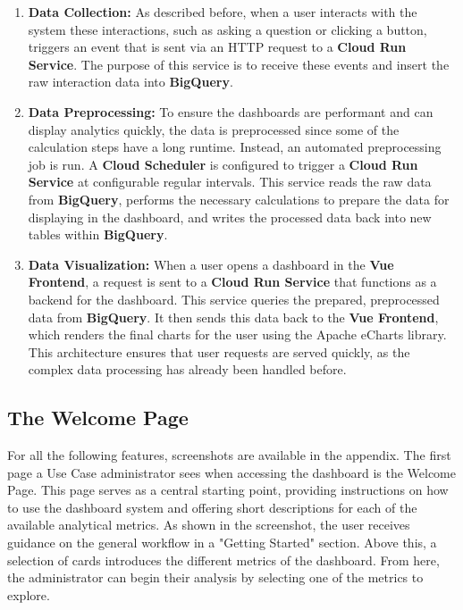 \documentclass[
	english,
	ruledheaders=section,%
	class=report,%
	thesis={type=bachelor},%
	accentcolor=1b,%
	custommargins=true,%
	marginpar=false,%
	parskip=half-,%
	fontsize=11pt,%
	DIV=14,
]{tudapub}
\begin{document}
\begin{enumerate}
    \item \textbf{Data Collection:} As described before, when a user interacts with the system these interactions, such as asking a question or clicking a button, triggers an event that is sent via an HTTP request to a \textbf{Cloud Run Service}. The purpose of this service is to receive these events and insert the raw interaction data into \textbf{BigQuery}.

    \item \textbf{Data Preprocessing:} To ensure the dashboards are performant and can display analytics quickly, the data is preprocessed since some of the calculation steps have a long runtime. Instead, an automated preprocessing job is run. A \textbf{Cloud Scheduler} is configured to trigger a \textbf{Cloud Run Service} at configurable regular intervals. This service reads the raw data from \textbf{BigQuery}, performs the necessary calculations to prepare the data for displaying in the dashboard, and writes the processed data back into new tables within \textbf{BigQuery}.

    \item \textbf{Data Visualization:} When a user opens a dashboard in the \textbf{Vue Frontend}, a request is sent to a \textbf{Cloud Run Service} that functions as a backend for the dashboard. This service queries the prepared, preprocessed data from \textbf{BigQuery}. It then sends this data back to the \textbf{Vue Frontend}, which renders the final charts for the user using the Apache eCharts library. This architecture ensures that user requests are served quickly, as the complex data processing has already been handled before.
\end{enumerate}
\subsection{The Welcome Page}
For all the following features, screenshots are available in the appendix.
The first page a Use Case administrator sees when accessing the dashboard is the Welcome Page. This page serves as a central starting point, providing instructions on how to use the dashboard system and offering short descriptions for each of the available analytical metrics. As shown in the screenshot, the user receives guidance on the general workflow in a "Getting Started" section. Above this, a selection of cards introduces the different metrics of the dashboard. From here, the administrator can begin their analysis by selecting one of the metrics to explore.
\end{document}
